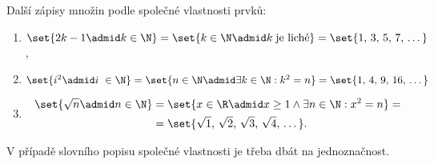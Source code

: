 \begin{example} Další zápisy množin podle společné vlastnosti prvků:
    \begin{enumerate}[label=(\roman*)]
        \item $\set{2k-1 \admid k \in \N}=\set{k\in\N \admid k\;\text{je liché}}=\set{1,\,3,\,5,\,7,\,\dots}$ ,
        \item $\set{i^2 \admid i~\in \N}=\set{n \in \N \admid \exists k\in\N: k^2=n}=\set{1,\,4,\,9,\,16,\,\dots}$
        \item 
        \begin{align*}
            \set{\sqrt{n} \admid n \in \N}&=\set{x \in \R \admid x \geq 1 \land \exists n\in\N: x^2=n}=\\
            &=\set{\sqrt{1},\,\sqrt{2},\,\sqrt{3},\,\sqrt{4},\,\dots}.
        \end{align*}
    \end{enumerate}
\end{example}
\begin{remark}
    V případě slovního popisu společné vlastnosti je třeba dbát na jednoznačnost.
\end{remark}

